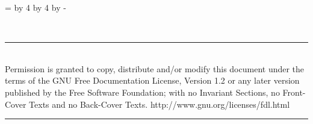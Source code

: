 \documentclass[8pt,pagesize,twoside,footexclude,headexclude]{scrartcl}
\begin{document}
\clearpage
\pagestyle{empty}
\newcount\currentpage 
\currentpage=\value{page} 
\divide\currentpage by 4  
\multiply\currentpage by 4  
\advance\currentpage by -\value{page}
%
\begin{titlepage}
  \begin{center}
    \renewcommand{\rmdefault}{ptm} %
    \vspace*{20pt}
    \vfill
    \begin{minipage}{\titlepagewidth}
      \begin{center}
        \rmfamily\mdseries\itshape\fontsize{300}{0}\selectfont
        \\
      \end{center}
    \end{minipage}
    \vfill
    \vspace*{43mm}%
    \begin{minipage}{\titlepagewidth}
      \hrule
      \vspace{1.5mm}
      \rmfamily\small
      \\[1.5mm] 
      Permission is granted to copy, distribute and/or modify this
      document under the terms of the GNU Free Documentation License,
      Version 1.2 or any later version published by the Free Software
      Foundation; with no Invariant Sections, no Front-Cover Texts and
      no Back-Cover Texts.\hfill
      http://www.gnu.org/licenses/fdl.html\\
      \vspace{-1mm}
      \hrule
    \end{minipage}
  \end{center}
\end{titlepage}
\end{document}
